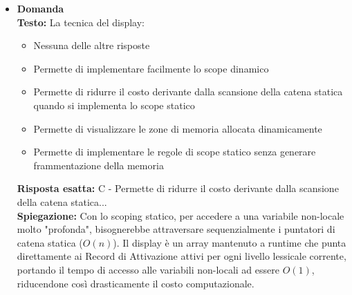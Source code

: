 \documentclass[12pt, a4paper]{article}
\newcounter{domandateoria}
\begin{document}
\begin{itemize}
\newpage

    \item {}\textbf{Domanda \thedomandateoria} \\
    \textbf{Testo:} La tecnica del display:
    \begin{itemize}
        \item[A)] Nessuna delle altre risposte
        \item[B)] Permette di implementare facilmente lo scope dinamico
        \item[C)] Permette di ridurre il costo derivante dalla scansione della catena statica quando si implementa lo scope statico
        \item[D)] Permette di visualizzare le zone di memoria allocata dinamicamente
        \item[E)] Permette di implementare le regole di scope statico senza generare frammentazione della memoria
    \end{itemize}
    \textbf{Risposta esatta:} C - Permette di ridurre il costo derivante dalla scansione della catena statica... \\
    \textbf{Spiegazione:} Con lo scoping statico, per accedere a una variabile non-locale molto "profonda", bisognerebbe attraversare sequenzialmente i puntatori di catena statica ($O(n)$). Il display è un array mantenuto a runtime che punta direttamente ai Record di Attivazione attivi per ogni livello lessicale corrente, portando il tempo di accesso alle variabili non-locali ad essere $O(1)$, riducendone così drasticamente il costo computazionale.
    \vspace{0.3cm}


\end{itemize}
\end{document}
